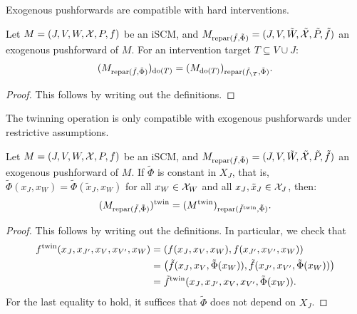 Exogenous pushforwards are compatible with hard interventions.
\begin{Lem}\label{lem:interventions_exogenous_pushforward_commute}
  Let $M = \left ( J, V, W, \mathcal{X}, P, f \right )$ be an iSCM, and $M_{\mathrm{repar}({\tilde{f}},{\tilde{\Phi}})} = ( J, V, \tilde{W}, \tilde{\mathcal{X}}, \tilde{P}, \tilde{f} )$ an exogenous pushforward of $M$.
For an intervention target $T \subseteq V \cup J$:
  $$(M_{\mathrm{repar}({\tilde{f}},{\tilde{\Phi}})})_{\operatorname{do}(T)} = (M_{\operatorname{do}(T)})_{\mathrm{repar}({\tilde{f}_{\setminus T}},{\tilde{\Phi}})}.$$
\end{Lem}
\begin{proof}
  This follows by writing out the definitions.
\end{proof}
The twinning operation is only compatible with exogenous pushforwards under restrictive assumptions.
\begin{Lem}\label{lem:twinning_exogenous_pushforward_commute}
  Let $M = \left ( J, V, W, \mathcal{X}, P, f \right )$ be an iSCM, and $M_{\mathrm{repar}({\tilde{f}},{\tilde{\Phi}})} = ( J, V, \tilde{W}, \tilde{\mathcal{X}}, \tilde{P}, \tilde{f} )$ an exogenous pushforward of $M$.
  If $\tilde{\Phi}$ is constant in $X_J$, that is, $\tilde{\Phi}(x_J,x_W) = \tilde{\Phi}(\tilde{x}_J,x_W)$ for all $x_W \in \mathcal{X}_W$ and all $x_J,\tilde{x}_J \in \mathcal{X}_J$, then:
  $$(M_{\mathrm{repar}({\tilde{f}},{\tilde{\Phi}})})^{\mathrm{twin}} = (M^{\mathrm{twin}})_{\mathrm{repar}({\tilde{f}^{\mathrm{twin}}},{\tilde{\Phi}})}.$$
\end{Lem}
\begin{proof}
  This follows by writing out the definitions. In particular, we check that
  \begin{equation*}\begin{split}
    f^{\mathrm{twin}}(x_J,x_{J'},x_V,x_{V'},x_W) 
    & = (f(x_J,x_V,x_W),f(x_{J'},x_{V'},x_W)) \\
    & = \big(\tilde{f}(x_J,x_V,\tilde{\Phi}(x_W)),\tilde{f}(x_{J'},x_{V'},\tilde{\Phi}(x_W))\big) \\
    & = \tilde{f}^{\mathrm{twin}}(x_J,x_{J'},x_V,x_{V'},\tilde{\Phi}(x_W)).
  \end{split}\end{equation*}
  For the last equality to hold, it suffices that $\tilde{\Phi}$ does not depend on $X_J$.
\end{proof}

